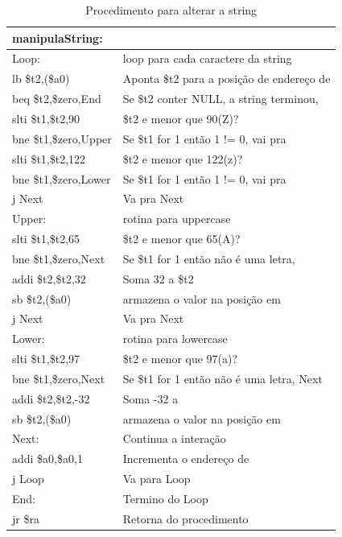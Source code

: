 \documentclass[12pt,a4paper]{article}
\numberwithin{figure}{subsection}
\numberwithin{table}{subsection}
\begin{document}
\begin{table}[H]
	\renewcommand{\arraystretch}{1}
	\centering
	\caption*{Procedimento para alterar a string}
	\label{q2cod:manipula}
	\begin{tabular}{>{\ttfamily}p{5cm} p{10cm}}
		\toprule
		manipulaString:        & \\
		\midrule[0.01cm]
		Loop:                  & loop para cada caractere da string \\
		lb \$t2,(\$a0)         & Aponta \$t2 para a posição de endereço de \ttfamily{\$a0} \\
		beq \$t2,\$zero,End    & Se \$t2 conter NULL, a string terminou, \ttfamily{End} \\
		slti \$t1,\$t2,90      & \$t2 e menor que 90(Z)? \\
		bne \$t1,\$zero,Upper  & Se \$t1 for 1 então 1 != 0, vai pra \ttfamily{Upper} \\
		slti \$t1,\$t2,122     & \$t2 e menor que 122(z)? \\
		bne \$t1,\$zero,Lower  & Se \$t1 for 1 então 1 != 0, vai pra \ttfamily{Lower} \\
		j Next                 & Va pra Next \\
		\midrule[0.01cm]
		Upper:                 & rotina para uppercase \\
		slti \$t1,\$t2,65      & \$t2 e menor que 65(A)? \\
		bne \$t1,\$zero,Next   & Se \$t1 for 1 então não é uma letra, \ttfamily{Next} \\
		addi \$t2,\$t2,32      & Soma 32 a \$t2 \\
		sb \$t2,(\$a0)         & armazena o valor na posição em \ttfamily{\$a0} \\
		j Next                 & Va pra Next \\
		\midrule[0.01cm]
		Lower:                 & rotina para lowercase \\
		slti \$t1,\$t2,97      & \$t2 e menor que 97(a)? \\
		bne \$t1,\$zero,Next   & Se \$t1 for 1 então não é uma letra, Next \\
		addi \$t2,\$t2,-32     & Soma -32 a \ttfamily{\$t2} \\
		sb \$t2,(\$a0)         & armazena o valor na posição em \ttfamily{\$a0} \\
		\midrule[0.01cm]
		Next:                  & Continua a interação \\
		addi \$a0,\$a0,1       & Incrementa o endereço de \ttfamily{\$a0} \\
		j Loop                 & Va para Loop \\
		\midrule[0.01cm]
		End:                   & Termino do Loop \\
		jr \$ra                & Retorna do procedimento \\
		\bottomrule
	\end{tabular}
\end{table}
\end{document}
